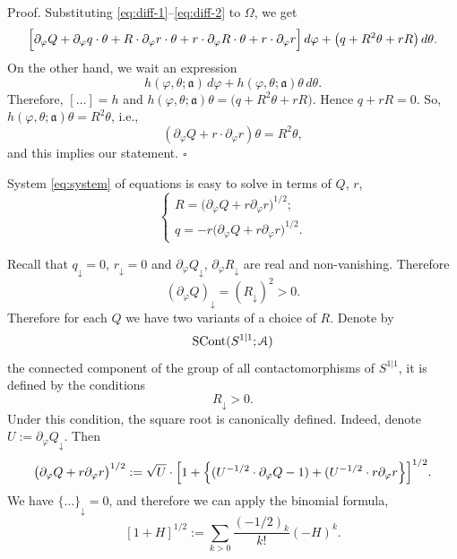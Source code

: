 \documentclass[]{amsart}
\def\phi{\varphi}
\def\cA{\EuScript A}
\def\fra{\mathfrak a}
\def\sm{\smallskip}
\def\SCont{\mathrm{SCont}}
\begin{document}
{\sc Proof.}
Substituting \eqref{eq:diff-1}--\eqref{eq:diff-2} to $\Omega$, we get
\begin{equation*}
 \Bigl[ \partial_\phi Q+ \partial_\phi q\cdot \theta + R\cdot \partial_\phi r\cdot \theta+ 
 r \cdot \partial_\phi R\cdot\theta + r\cdot \partial_\phi r\Bigr]\,d\phi 
 +
 \bigl(q+R^2\theta +r R\bigr)\,d\theta.
\end{equation*}
On the other hand, we wait an expression
$$
h(\phi,\theta;\fra) \,d\phi+ h(\phi,\theta;\fra)\theta\,d\theta.
$$
Therefore, $[\dots]=h$ and 
$h(\phi,\theta;\fra)\theta=\bigl(q+R^2\theta +r R\bigr)$.
Hence $q+rR=0$.
So, $h(\phi,\theta;\fra)\theta =R^2\theta$, i.e.,
$$ (\partial_\phi Q+r\cdot \partial_\phi r)\theta=R^2\theta,$$
and this implies our statement.
\hfill $\square$

\sm

System \eqref{eq:system} of equations is easy to solve in terms of $Q$, $r$,
\begin{equation}
\begin{cases}
 R=\bigl(\partial_\phi Q+r \partial_\phi r\bigr)^{1/2};
 \\
 q=-r\bigl(\partial_\phi Q+r \partial_\phi r\bigr)^{1/2}.
\end{cases}
\label{eq:solution}
\end{equation}

Recall that $q_\downarrow=0$, $r_\downarrow=0$ 
and
$\partial_\phi Q_\downarrow$, $\partial_\phi R_\downarrow$ are  real and non-vanishing.
Therefore 
$$(\partial_\phi Q)_\downarrow= (R_\downarrow)^2>0.$$
  Therefore for each $Q$ we have two variants of a choice of $R$.
Denote by
$$\SCont(S^{1|1};\cA)$$
 the connected component of the group of all contactomorphisms of
  $S^{1|1}$, it is defined by the conditions
$$ R_\downarrow>0.$$
Under this condition, the square root is canonically defined.
Indeed, denote $U:=\partial_\phi Q_\downarrow$. Then
$$
\bigl(\partial_\phi Q+r \partial_\phi r\bigr)^{1/2}
:=\sqrt U\cdot
\Bigl[1+ 
\Bigl\{(U^{-1/2}\cdot\partial_\phi Q-1)+
(U^{-1/2}\cdot r \partial_\phi r\Bigr\}\Bigr]^{1/2}.
$$
We have $\{\dots\}_\downarrow=0$, and therefore we 
can apply the binomial formula,
$$[1+H]^{1/2}:=\sum_{k>0} \frac{(-1/2)_k}{k!}(-H)^k.$$
\end{document}
